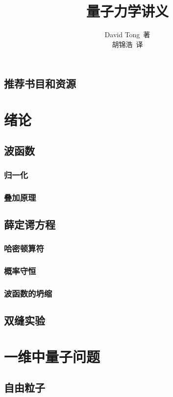 \documentclass{book}
\title{量子力学讲义}
\author{David Tong\ 著\\胡锦浩\ 译}
\date{}
\begin{document}
\maketitle
\section*{推荐书目和资源}

\tableofcontents
\chapter{绪论}%

\section{波函数}%

\subsection{归一化}%

\subsection{叠加原理}%

\section{薛定谔方程}%
\subsection{哈密顿算符}%
\subsection{概率守恒}%
\subsection{波函数的坍缩}%
\section{双缝实验}%
\chapter{一维中量子问题}%
\section{自由粒子}%
\end{document}
